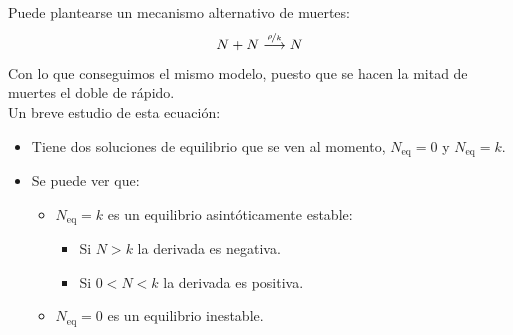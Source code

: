 \noindent
Puede plantearse un mecanismo alternativo de muertes:
\begin{equation*}
    N+N\stackrel{\nicefrac{\rho}{k}}{\longrightarrow} N
\end{equation*}
Con lo que conseguimos el mismo modelo, puesto que se hacen la mitad de muertes el doble de rápido.\\

\noindent
Un breve estudio de esta ecuación:
\begin{itemize}
    \item Tiene dos soluciones de equilibrio que se ven al momento, $N_{\text{eq}} = 0$ y $N_{\text{eq}} = k$.
    \item Se puede ver que:
        \begin{itemize}
            \item $N_{\text{eq}} = k$ es un equilibrio asintóticamente estable:
                \begin{itemize}
                    \item Si $N>k$ la derivada es negativa.
                    \item Si $0<N<k$ la derivada es positiva.
                \end{itemize}
            \item $N_{\text{eq}} = 0$ es un equilibrio inestable.
        \end{itemize}
\end{itemize}

